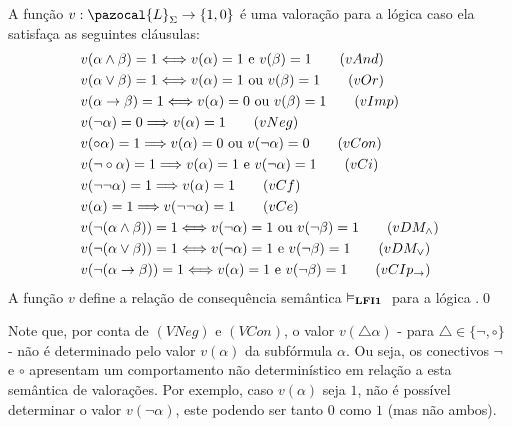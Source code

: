         \begin{definicao} 
            \label{def:valoracoes}
            A função $v : \pazocal{L}_{\Sigma} \rightarrow \{1, 0\}$ é uma valoração para a lógica \lfium{} caso ela satisfaça as seguintes cláusulas:
            \begin{align*}
                & v(\alpha \land \beta) = 1 \Longleftrightarrow v(\alpha) = 1 \text{ e } v(\beta) = 1\tag{\textbf{$vAnd$}}\\
                & v(\alpha \lor \beta) = 1 \Longleftrightarrow v(\alpha) = 1 \text{ ou } v(\beta) = 1\tag{\textbf{$vOr$}}\\
                & v(\alpha \rightarrow \beta) = 1 \Longleftrightarrow v(\alpha) = 0 \text{ ou } v(\beta) = 1\tag{\textbf{$vImp$}}\\
                & v(\neg \alpha) = 0 \Longrightarrow v(\alpha) = 1\tag{\textbf{$vNeg$}}\\
                & v(\circ \alpha) = 1 \Longrightarrow v(\alpha) = 0 \text{ ou } v(\neg \alpha) = 0\tag{\textbf{$vCon$}}\\
                & v(\neg \circ \alpha) = 1 \Longrightarrow v(\alpha) = 1 \text{ e } v(\neg \alpha) = 1\tag{\textbf{$vCi$}}\\
                & v(\neg \neg \alpha) = 1 \Longrightarrow v(\alpha) = 1\tag{\textbf{$vCf$}}\\
                & v(\alpha) = 1 \Longrightarrow v(\neg \neg \alpha) = 1\tag{\textbf{$vCe$}}\\
                & v(\neg (\alpha \land \beta)) = 1 \Longleftrightarrow v(\neg \alpha) = 1 \text{ ou } v(\neg \beta) = 1\tag{\textbf{$vDM_{\land}$}}\\
                & v(\neg (\alpha \lor \beta)) = 1 \Longleftrightarrow v(\neg \alpha) = 1 \text{ e } v(\neg \beta) = 1\tag{\textbf{$vDM_{\lor}$}}\\
                & v(\neg (\alpha \rightarrow \beta)) = 1 \Longleftrightarrow v(\alpha) = 1 \text{ e } v(\neg \beta) = 1\tag{\textbf{$vCIp_{\rightarrow}$}}
            \end{align*}
            A função $v$ define a relação de consequência semântica $\vDash_{\textbf{LFI1}{}}{}$ para a lógica \lfium{}.\qed{}
        \end{definicao}

        Note que, por conta de $(VNeg)$ e $(VCon)$, o valor $v(\triangle \alpha)$ {-} para $\triangle \in \{\neg, \circ\}$ {-} não é determinado pelo valor $v(\alpha)$ da subfórmula $\alpha$. Ou seja, os conectivos $\neg$ e $\circ$ apresentam um comportamento não determinístico em relação a esta semântica de valorações. Por exemplo, caso $v(\alpha)$ seja $1$, não é possível determinar o valor  $v(\neg \alpha)$, este podendo ser tanto $0$ como $1$ (mas não ambos).
        

